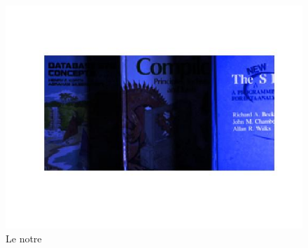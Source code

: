 \documentclass{article}
\begin{document}
\begin{figure}[h]
\begin{minipage}{0.33\textwidth}
\includegraphics[width=1\textwidth]{images/book_conc_tmr.jpg}
\caption{Le notre}
\end{minipage}
\end{figure}
\end{document}
